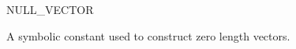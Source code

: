 \begin{ccRefConstant}{NULL_VECTOR}


\ccDefinition
A symbolic constant used to construct zero length vectors.

\ccSeeAlso
{} \\
 \\

\end{ccRefConstant}

